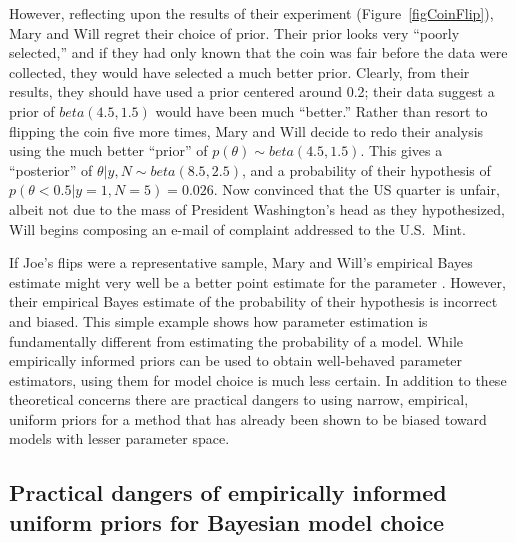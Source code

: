 \documentclass[letterpaper,12pt]{article}
\begin{document}
\begin{linenumbers}
However, reflecting upon the results of their experiment
(Figure~\ref{figCoinFlip}), Mary and Will regret their choice of prior.
Their prior looks very ``poorly selected,'' and if they had only known that the
coin was fair before the data were collected, they would have selected a much
better prior.
Clearly, from their results, they should have used a prior centered
around 0.2; their data suggest a prior of $beta(4.5, 1.5)$ would have been
much ``better.''
Rather than resort to flipping the coin five more times, Mary and Will decide
to redo their analysis using the much better ``prior'' of $p(\theta) \sim
beta(4.5, 1.5)$.
This gives a ``posterior'' of $\theta|y,N \sim beta(8.5, 2.5)$, and a
probability of their hypothesis of $p(\theta < 0.5 | y=1, N=5) = 0.026$.
Now convinced that the US quarter is unfair, albeit not due to the mass of
President Washington's head as they hypothesized, Will begins composing an
e-mail of complaint addressed to the U.S.\ Mint.

If Joe's flips were a representative sample, Mary and Will's empirical Bayes
estimate might very well be a better point estimate for the parameter
\myTheta{}.
However, their empirical Bayes estimate of the probability of their hypothesis
is incorrect and biased.
This simple example shows how parameter estimation is fundamentally different
from estimating the probability of a model.
While empirically informed priors can be used to obtain well-behaved parameter
estimators, using them for model choice is much less certain.
In addition to these theoretical concerns there are practical dangers to
using narrow, empirical, uniform priors for a method that has already
been shown to be biased toward models with lesser parameter space.

\subsection*{Practical dangers of empirically informed uniform priors for
    Bayesian model choice}


\end{linenumbers}
\end{document}
